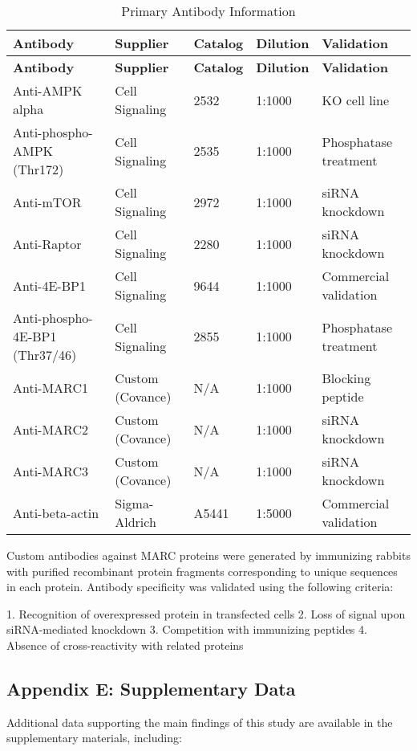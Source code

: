 \documentclass[11pt,a4paper]{article}
\begin{document}
\begin{longtable}{|p{2.5cm}|p{2cm}|p{2cm}|p{2cm}|p{3cm}|}
\caption{Primary Antibody Information} \\
\hline
\textbf{Antibody} & \textbf{Supplier} & \textbf{Catalog} & \textbf{Dilution} & \textbf{Validation} \\
\hline
\endfirsthead
\hline
\textbf{Antibody} & \textbf{Supplier} & \textbf{Catalog} & \textbf{Dilution} & \textbf{Validation} \\
\hline
\endhead
Anti-AMPK alpha & Cell Signaling & 2532 & 1:1000 & KO cell line \\
Anti-phospho-AMPK (Thr172) & Cell Signaling & 2535 & 1:1000 & Phosphatase treatment \\
Anti-mTOR & Cell Signaling & 2972 & 1:1000 & siRNA knockdown \\
Anti-Raptor & Cell Signaling & 2280 & 1:1000 & siRNA knockdown \\
Anti-4E-BP1 & Cell Signaling & 9644 & 1:1000 & Commercial validation \\
Anti-phospho-4E-BP1 (Thr37/46) & Cell Signaling & 2855 & 1:1000 & Phosphatase treatment \\
Anti-MARC1 & Custom (Covance) & N/A & 1:1000 & Blocking peptide \\
Anti-MARC2 & Custom (Covance) & N/A & 1:1000 & siRNA knockdown \\
Anti-MARC3 & Custom (Covance) & N/A & 1:1000 & siRNA knockdown \\
Anti-beta-actin & Sigma-Aldrich & A5441 & 1:5000 & Commercial validation \\
\hline
\end{longtable}

Custom antibodies against MARC proteins were generated by immunizing rabbits with purified recombinant protein fragments corresponding to unique sequences in each protein. Antibody specificity was validated using the following criteria:

1. Recognition of overexpressed protein in transfected cells
2. Loss of signal upon siRNA-mediated knockdown
3. Competition with immunizing peptides
4. Absence of cross-reactivity with related proteins

\subsection*{Appendix E: Supplementary Data}

Additional data supporting the main findings of this study are available in the supplementary materials, including:
\end{document}

